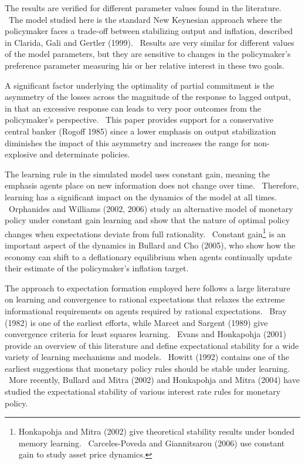 \documentclass{article}
\begin{document}
\begin{doublespace}
The results are verified for different parameter values found in the
literature. \ The model studied here is the standard New Keynesian approach
where the policymaker faces a trade-off between stabilizing output and
inflation, described in Clarida, Gali and Gertler (1999). \ Results are very
similar for different values of the model parameters, but they are sensitive
to changes in the policymaker's preference parameter measuring his or her
relative interest in these two goals. \ 

A significant factor underlying the optimality of partial commitment is the
asymmetry of the losses across the magnitude of the response to lagged
output, in that an excessive response can leads to very poor outcomes from
the policymaker's perspective. \ This paper provides support for a
conservative central banker (Rogoff 1985) since a lower emphasis on output
stabilization diminishes the impact of this asymmetry and increases the
range for non-explosive and determinate policies.

The learning rule in the simulated model uses constant gain, meaning the
emphasis agents place on new information does not change over time. \
Therefore, learning has a significant impact on the dynamics of the model at
all times. \ Orphanides and Williams (2002, 2006) study an alternative model
of monetary policy under constant gain learning and show that the nature of
optimal policy changes when expectations deviate from full rationality. \
Constant gain\footnote{%
Honkapohja and Mitra (2002) give theoretical stability results under bonded
memory learning. \ Carceles-Poveda and Giannitsarou (2006) use constant gain
to study asset price dynamics.} is an important aspect of the dynamics in
Bullard and Cho (2005), who show how the economy can shift to a deflationary
equilibrium when agents continually update their estimate of the
policymaker's inflation target. \ 

The approach to expectation formation employed here follows a large
literature on learning and convergence to rational expectations that relaxes
the extreme informational requirements on agents required by rational
expectations. \ Bray (1982) is one of the earliest efforts, while Marcet and
Sargent (1989) give convergence criteria for least squares learning. \ Evans
and Honkapohja (2001) provide an overview of this literature and define
expectational stability for a wide variety of learning mechanisms and
models. \ Howitt (1992) contains one of the earliest suggestions that
monetary policy rules should be stable under learning. \ More recently,
Bullard and Mitra (2002) and Honkapohja and Mitra (2004) have studied the
expectational stability of various interest rate rules for monetary policy.


\end{doublespace}
\end{document}
